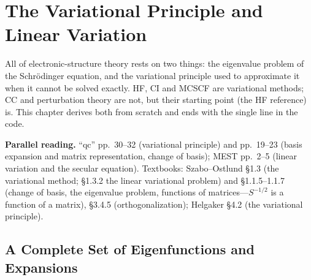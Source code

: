 \chapter{The Variational Principle and Linear Variation}
\label{ch:variational}

All of electronic-structure theory rests on two things: the eigenvalue problem of the Schrödinger equation, and the variational principle used to approximate it when it cannot be solved exactly. HF, CI and MCSCF are variational methods; CC and perturbation theory are not, but their starting point (the HF reference) is. This chapter derives both from scratch and ends with the single line  in the code.

\textbf{Parallel reading.} “qc” pp.~30--32 (variational principle) and pp.~19--23 (basis expansion and matrix representation, change of basis); MEST pp.~2--5 (linear variation and the secular equation). Textbooks: Szabo--Ostlund §1.3 (the variational method; §1.3.2 the linear variational problem) and §1.1.5--1.1.7 (change of basis, the eigenvalue problem, functions of matrices---$S^{-1/2}$ is a function of a matrix), §3.4.5 (orthogonalization); Helgaker §4.2 (the variational principle).

\section{A Complete Set of Eigenfunctions and Expansions}

